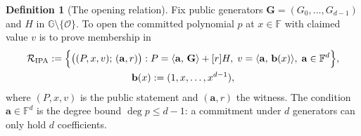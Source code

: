 \documentclass[11pt,a4paper]{article}
\theoremstyle{definition}
\newtheorem{definition}[theorem]{Definition}
\newcommand{\F}{\mathbb{F}}
\newcommand{\G}{\mathbb{G}}
\newcommand{\ip}[2]{\langle #1,\, #2 \rangle}
\newcommand{\Rel}{\mathcal{R}}
\begin{document}
\begin{definition}[The opening relation]\label{def:ipa-rel}
Fix public generators $\mathbf G = (G_0, \dots, G_{d-1})$ and $H$ in
$\G \setminus \{\mathcal O\}$. To open the
committed polynomial $p$ at $x \in \F$ with claimed value $v$ is to
prove membership in
\begin{gather*}
\Rel_{\mathrm{IPA}} := \Bigl\{ \bigl((P, x, v);\, (\mathbf a, r)\bigr) :
  P = \ip{\mathbf a}{\mathbf G} + [r]H,\;
  v = \ip{\mathbf a}{\mathbf b(x)},\;
  \mathbf a \in \F^{d} \Bigr\}, \\
\mathbf b(x) := (1, x, \dots, x^{d-1}),
\end{gather*}
where $(P, x, v)$ is the public statement and $(\mathbf a, r)$ the
witness. The condition $\mathbf a \in \F^d$ is the degree bound
$\deg p \le d - 1$: a commitment under $d$ generators can only hold $d$
coefficients.
\end{definition}
\end{document}
